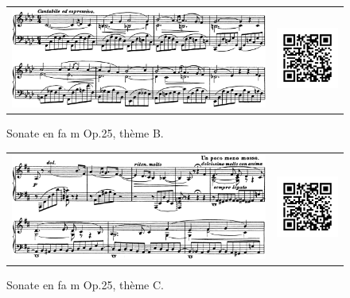 \begin{figure}[!p]
  \begin{bigcenter}
    \begin{tabular}{lr}
      \includegraphics[width=12.5cm, keepaspectratio]{sonate-theme-B.png}
      &
      \includegraphics[width=3cm, keepaspectratio]{op1-qr.png}
    \end{tabular}
  \end{bigcenter}
  \caption{\label{sonate-theme-1}Sonate en fa m Op.25, thème B.}
\end{figure}

\begin{figure}[!p]
  \begin{bigcenter}
    \begin{tabular}{lr}
      \includegraphics[width=12.5cm, keepaspectratio]{sonate-theme-C.png}
      &
      \includegraphics[width=3cm, keepaspectratio]{op1-qr.png}
    \end{tabular}
  \end{bigcenter}
  \caption{\label{sonate-theme-1}Sonate en fa m Op.25, thème C.}
\end{figure}

